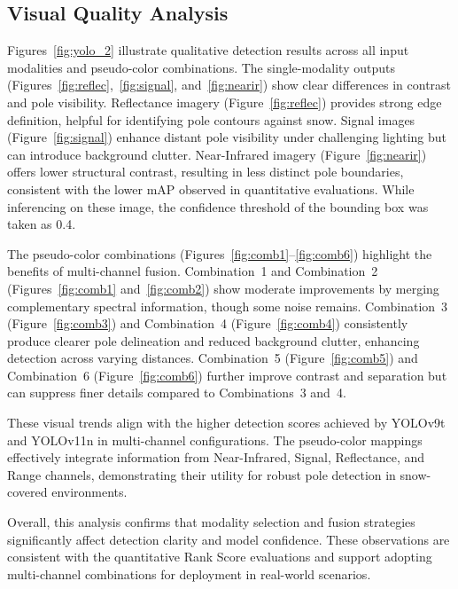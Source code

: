 \documentclass[runningheads]{llncs}
\begin{document}
\subsection{Visual Quality Analysis}

Figures~\ref{fig:yolo_2} illustrate qualitative detection results across all input modalities and pseudo-color combinations. The single-modality outputs (Figures~\ref{fig:reflec},~\ref{fig:signal}, and~\ref{fig:nearir}) show clear differences in contrast and pole visibility. Reflectance imagery (Figure~\ref{fig:reflec}) provides strong edge definition, helpful for identifying pole contours against snow. Signal images (Figure~\ref{fig:signal}) enhance distant pole visibility under challenging lighting but can introduce background clutter. Near-Infrared imagery (Figure~\ref{fig:nearir}) offers lower structural contrast, resulting in less distinct pole boundaries, consistent with the lower mAP observed in quantitative evaluations. While inferencing on these image, the confidence threshold of the bounding box was taken as 0.4.

The pseudo-color combinations (Figures~\ref{fig:comb1}--\ref{fig:comb6}) highlight the benefits of multi-channel fusion. Combination~1 and Combination~2 (Figures~\ref{fig:comb1} and~\ref{fig:comb2}) show moderate improvements by merging complementary spectral information, though some noise remains. Combination~3 (Figure~\ref{fig:comb3}) and Combination~4 (Figure~\ref{fig:comb4}) consistently produce clearer pole delineation and reduced background clutter, enhancing detection across varying distances. Combination~5 (Figure~\ref{fig:comb5}) and Combination~6 (Figure~\ref{fig:comb6}) further improve contrast and separation but can suppress finer details compared to Combinations~3 and~4.

These visual trends align with the higher detection scores achieved by YOLOv9t and YOLOv11n in multi-channel configurations. The pseudo-color mappings effectively integrate information from Near-Infrared, Signal, Reflectance, and Range channels, demonstrating their utility for robust pole detection in snow-covered environments.

Overall, this analysis confirms that modality selection and fusion strategies significantly affect detection clarity and model confidence. These observations are consistent with the quantitative Rank Score evaluations and support adopting multi-channel combinations for deployment in real-world scenarios.
\end{document}
